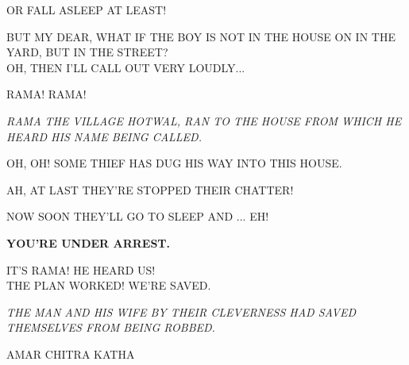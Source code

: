 OR FALL ASLEEP AT LEAST!
\par
BUT MY DEAR, WHAT IF THE BOY IS NOT IN THE HOUSE ON IN THE YARD, BUT IN THE STREET?\\
OH, THEN I'LL CALL OUT VERY LOUDLY...
\par
RAMA! RAMA!
\par
\textit{RAMA THE VILLAGE HOTWAL, RAN TO THE HOUSE FROM WHICH HE HEARD HIS NAME BEING CALLED.}
\par
OH, OH! SOME THIEF HAS DUG HIS WAY INTO THIS HOUSE.
\par
AH, AT LAST THEY'RE STOPPED THEIR CHATTER!
\par
NOW SOON THEY'LL GO TO SLEEP AND ... EH!
\par
\textbf{YOU'RE UNDER ARREST.}
\par
IT'S RAMA! HE HEARD US!\\
THE PLAN WORKED! WE'RE SAVED.
\par
\textit{THE MAN AND HIS WIFE BY THEIR CLEVERNESS HAD SAVED THEMSELVES FROM BEING ROBBED.}
\par
AMAR CHITRA KATHA
